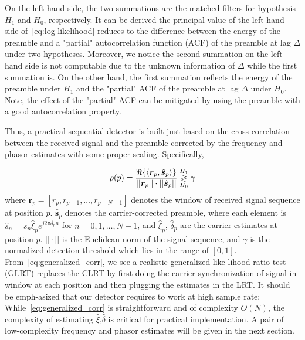 On the left hand side, the two summations are the matched filters for hypothesis $H_1$
and $H_0$, respectively. 
It can be derived the principal value of the left hand side of~\eqref{eq:log likelihood}
reduces to the difference between the energy of the preamble and a "partial"
autocorrelation function (ACF) of the preamble at lag $\Delta$ under two hypotheses.
Moreover, we notice the second summation on the left hand side is not computable
due to the unknown information of $\Delta$ while the first summation is.
On the other hand,
the first summation reflects the energy of the preamble
under $H_1$ and the "partial" ACF of the preamble at lag $\Delta$ under $H_0$.
Note, the effect of the "partial" ACF can be mitigated by using the preamble
with a good autocorrelation property.

Thus, a practical sequential detector is built just based on the
cross-correlation between the received signal
and the preamble corrected by the frequency and phasor estimates with some proper scaling. Specifically,

\begin{equation}
  \label{eq:generalized_corr}
  \rho(p)=
  \frac{\Re\{\langle
    \bm{r}_{p},\hat{\bm{s}}_{p}\rangle\}}
  {||\bm{r}_{p}||\cdot||\hat{\bm{s}}_{p}||} \mathrel{\mathop\gtrless\limits^{H_1}_{H_0}} \gamma
\end{equation}
where $\bm{r}_{p}{=}[r_{p},r_{p+1},\ldots,r_{p+N-1}]$ denotes the window of received signal
sequence at position $p$. $\hat{\bm{s}}_{p}$ denotes the carrier-corrected preamble,
where each element is $\hat{s}_{n}=s_n\hat{\xi}_{p}e^{j2\pi\hat{\delta}_{p}n}$
for $n=0,1,\ldots,N{-}1$, and $\hat{\xi}_{p}$, $\hat{\delta}_{p}$ are the carrier estimates at
position $p$.
$||\cdot||$ is the Euclidean norm of the signal sequence,
and $\gamma$ is the normalized detection threshold which lies in the range of $[0,1]$. 
From~\eqref{eq:generalized_corr}, we see
a realistic generalized like-lihood ratio test (GLRT) replaces the CLRT
by first doing the carrier synchronization of signal in window at each position
and then plugging the estimates in the LRT. 
It should be emph-asized that our detector requires to work at high sample rate;
While~\eqref{eq:generalized_corr} is straightforward and of complexity 
$O(N)$, the complexity of estimating $\hat{\xi}$,$\hat{\delta}$
is critical for practical implementation.  
A pair of low-complexity frequency and phasor estimates will be given in the next section.



